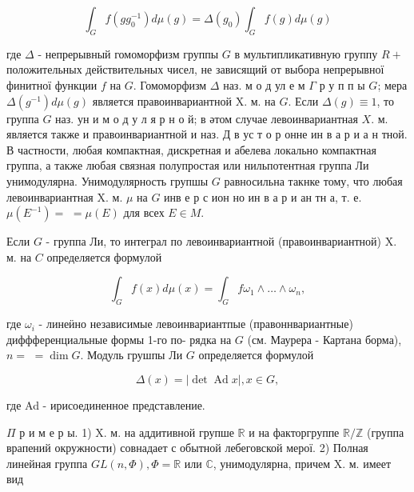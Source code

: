 \documentclass[10pt]{article}
\begin{document}
\[

\int_{G} f\left(g g_{0}^{-1}\right) d \mu(g)=\Delta\left(g_{0}\right) \int_{G} f(g) d \mu(g)

\]



где $\Delta$ - непрерывный гомоморфизм группы $G$ в мультипликативную группу $R+$ положительных действительных чисел, не зависящий от выбора непрерывної финитної функции $f$ на $G$. Гомоморфизм $\Delta$ наз. м о д ул е м $\Gamma$ р у п п ы $G$; мера $\Delta\left(g^{-1}\right) d \mu(g)$ является правоинвариантной $\mathrm{X}$. м. на $G$. Если $\Delta(g) \equiv 1$, то группа $G$ наз. ун и м о д у л я р н о й; в әтом случае левоинвариантная $X$. м. является также и правоинвариантной и наз. Д в ус т о р онне ин в а р и а н тной. В частности, любая компактная, дискретная и абелева локально компактная группа, а также любая связная полупростая или нильпотентная группа Ли унимодулярна. Унимодулярность групшы $G$ равносильна такнке тому, что любая левоинвариантная X. м. $\mu$ на $G$ инв е р с ион но ин в а р и ан тн а, т. е. $\mu\left(E^{-1}\right)=$ $=\mu(E)$ для всех $E \in M$.



Если $G$ - группа Ли, то интеграл по левоинвариантной (правоинвариантной) X. м. на $C$ определяется формулой



\[

\int_{G} f(x) d \mu(x)=\int_{G} f \omega_{1} \wedge \ldots \wedge \omega_{n},

\]



где $\omega_{i}$ - линеӥно независимые левоинвариантпые (правоннвариантные) диффференциальные формы 1-го по- рядка на $G$ (см. Маурера - Картана борма), $n=$ $=\operatorname{dim} G$. Модуль грушпы Ли $G$ определяется формулой



\[

\Delta(x)=|\operatorname{det} \operatorname{Ad} x|, x \in G,

\]



где Ad - ирисоединенное представление.



$\Pi$ р и м е р ы. 1) X. м. на аддитивной групше $\mathbb{R}$ и на факторгруппе $\mathbb{R} / \mathbb{Z}$ (группа врапений окружности) совнадает с обытной лебеговской мерої. 2) Полная линейная группа $G L(n, \Phi), \Phi=\mathbb{R}$ или $\mathbb{C}$, унимодулярна, причем X. м. имеет вид
\end{document}
